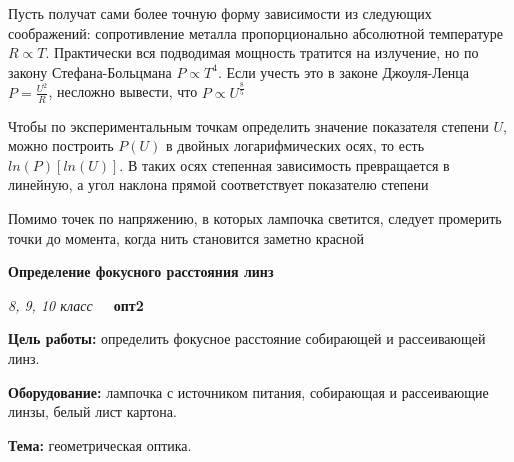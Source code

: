 \documentclass[a4paper,10pt]{article}
\newcommand{\labtitle}[7]{
	\textbf{#2}\par
	\textit{#1 класс}~~~\textbf{#3}\par
	\textbf{Цель работы:} #4\par
	\textbf{Оборудование:} #5\par
	\textbf{Тема:} #6
}
\begin{document}
\begin{enumerate}
{        \item Пусть получат сами более точную форму зависимости из следующих соображений: сопротивление металла пропорционально абсолютной температуре $R \propto T$. Практически вся подводимая мощность тратится на излучение, но по закону Стефана-Больцмана $P \propto T^4$. Если учесть это в законе Джоуля-Ленца $P=\frac{U^2}{R}$, несложно вывести, что $P \propto U^\frac{8}{5}$
        \item Чтобы по экспериментальным точкам определить значение показателя степени $U$, можно построить $P(U)$ в двойных логарифмических осях, то есть $ln(P)[ln(U)]$. В таких осях степенная зависимость превращается в линейную, а угол наклона прямой соответствует показателю степени
        \item Помимо точек по напряжению, в которых лампочка светится, следует промерить точки до момента, когда нить становится заметно красной}
	\item \labtitle
		{8, 9, 10}
		{Определение фокусного расстояния линз}
		{опт2}
		{определить фокусное расстояние собирающей и рассеивающей линз.}
		{лампочка с источником питания, собирающая и рассеивающие линзы, белый лист картона.}
		{геометрическая оптика.}
		{\item Вспоминаем геометрическую оптику. Как строятся изображения в тонких линзах. Действительное, мнимое, перевернутое... Формула тонкой линзы! Концепция того, что когда у нас несколько линз, следующая видит изображение предыдущей
		\item Как в целом устроена логика лабы: сначала строим в собирающей линзе изображение лампочки, измеряем расстояния до лампочки и изображения, по формуле тонкой линзы вычисляем её фокусное расстояние. С рассеивающей линзой проблема в том, что она всегда создаёт мнимое изображение, расстояние до него не измерить прямым образом. Поэтому собираем систему: ставим рассеивающую линзу, затем собирающей переводим мнимое изображение в действительное. Зная фокусное расстояние собирающей, восстанавливаем расположение промежуточного мнимого изображения
		\item Есть альтернативный способ найти фокусное расстояние собирающей линзы: построить на экране изображение <<бесконечно удалённого>> объекта, например облаков или крон деревьев. Изображение будет примерно в фокусе
		\item Про погрешности: линза не тонкая. Как правильно измерить расстояние до толстой линзы "--- непонятно, поэтому разумно выбрать толщину линзы за погрешность
		\item А как работает лупа?}

\end{enumerate}
\end{document}
